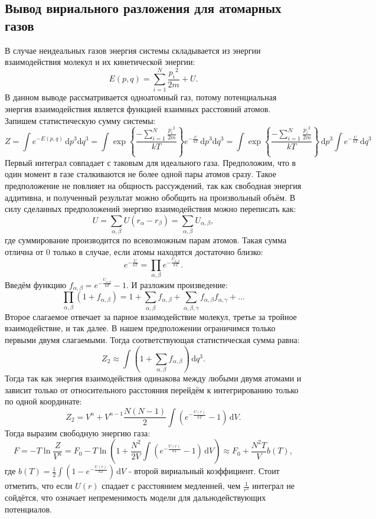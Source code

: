\documentclass[12pt]{article}
\begin{document}
\subsection*{Вывод вириального разложения для атомарных газов} \label{app:1}
В случае неидеальных газов энергия системы складывается из энергии взаимодействия молекул и их кинетической энергии: 
\[
    E(p, q) = \sum_{i=1}^{N} \frac{{p_i}^2}{2m} + U.
\]
В данном выводе рассматривается одноатомный газ, потому потенциальная энергия взаимодействия является функцией взаимных расстояний атомов. 
Запишем статистическую сумму системы: 
\[
    Z = \int e^{-E(p, q)} \,\mathrm{d}p^3\mathrm{d}q^3 = 
    \int \exp {\left\{ \frac{-\sum_{i=1}^{N} \frac{{p_i}^2}{2m}}{kT} \right\} }  e^{-\frac{U}{kT}} \,\mathrm{d}p^3\mathrm{d}q^3 = 
    \int \exp {\left\{ \frac{-\sum_{i=1}^{N} \frac{{p_i}^2}{2m}}{kT} \right\} }  \,\mathrm{d}p^3 \int e^{-\frac{U}{kT}} \,\mathrm{d}q^3
\]
Первый интеграл совпадает с таковым для идеального газа. Предположим, что в один момент в газе сталкиваются не более одной пары атомов сразу.
Такое предположение не повлияет на общность рассуждений, так как свободная энергия аддитивна, и полученный 
результат можно обобщить на произвольный объём. В силу сделанных предположений энергию взаимодействия можно переписать как: 
\[
    U = \sum_{\alpha, \beta} U(r_\alpha - r_\beta) = \sum_{\alpha, \beta} U_{\alpha, \beta},   
\]
где суммирование производится по всевозможным парам атомов. 
Такая сумма отлична от 0 только в случае, если атомы находятся достаточно близко: 
\[
    e^{-\frac{U}{kT}} = \prod_{\alpha, \beta} e^{-\frac{U_{\alpha, \beta}}{kT}}.
\]
Введём функцию $f_{\alpha, \beta} = e^{-\frac{U_{\alpha, \beta}}{kT}} - 1$. И разложим произведение: 
\[
    \prod_{\alpha, \beta} \left( 1 + f_{\alpha, \beta} \right) = 1 + \sum_{\alpha, \beta} f_{\alpha, \beta} + \sum_{\alpha, \beta, \gamma} f_{\alpha, \beta} f_{\alpha, \gamma} + \dots   
\] 
Второе слагаемое отвечает за парное взаимодействие молекул, третье за тройное взаимодействие, и так далее. В нашем предположении 
ограничимся только первыми двумя слагаемыми. Тогда соответствующая статистическая сумма равна: 
\[
    Z_2 \approx \int \left( 1 + \sum_{\alpha, \beta} f_{\alpha, \beta} \right) \, \mathrm{d}q^3.
\]
Тогда так как энергия взаимодействия одинакова между любыми двумя атомами и зависит только от относительного расстояния перейдём к интегрированию только по одной координате: 
\[
    Z_2 = V^n + V^{n-1} \frac{N(N - 1)}{2} \int \left( e^{-\frac{U(r)}{kT}} - 1 \right) \,\mathrm{d}V.
\]
Тогда выразим свободную энергию газа: 
\[
    F = -T \ln \frac{Z}{V^n} = F_0 - T \ln \left( 1 + \frac{N^2}{2V} \int \left( e^{-\frac{U(r)}{kT}} - 1 \right) \,\mathrm{d}V \right) \approx 
    F_0 + \frac{N^2T}{V} b(T),  
\]
где $b(T) = \frac{1}{2} \int \left( 1 - e^{-\frac{U(r)}{kT}} \right) \,\mathrm{d}V$ - второй вириальный коэффициент.
Стоит отметить, что если $U(r)$ спадает с расстоянием медленней, чем $\frac{1}{r^3}$ интеграл не сойдётся, что означает 
непременимость модели для дальнодействующих потенциалов. 
\end{document}
